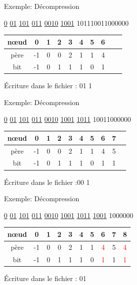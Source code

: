 \documentclass[french]{beamer}
\begin{document}
\begin{frame}{Exemple: Décompression}
\begin{center}
\underline{0} \underline{01} \underline{101} \underline{011} \underline{0010} \underline{1001} 101110011000000
\end{center}

	\begin{center}
	\begin{tabular}{|c|c|c|c|c|c|c|c|c|c|}
	\hline
	nœud & 0 & 1 & 2 & 3 & 4 & 5 & 6 \\
	\hline
	père & -1 & 0 & 0 & 2 & 1 & 1 & 4  \\
	\hline
	bit & -1 & 0 & 1 & 1 & 1 & 0 & 1 \\
	\hline 
	\end{tabular}
	\end{center}
	\begin{center}
	Écriture dans le fichier : 01 1
	\end{center}
\end{frame}

\begin{frame}{Exemple: Décompression}
\begin{center}
\underline{0} \underline{01} \underline{101} \underline{011} \underline{0010} \underline{1001} \underline{1011} 10011000000
\end{center}

	\begin{center}
	\begin{tabular}{|c|c|c|c|c|c|c|c|c|c|}
	\hline
	nœud & 0 & 1 & 2 & 3 & 4 & 5 & 6 & 7 \\
	\hline
	père & -1 & 0 & 0 & 2 & 1 & 1 & 4 & 5  \\
	\hline
	bit & -1 & 0 & 1 & 1 & 1 & 0 & 1 & 1 \\
	\hline 
	\end{tabular}
	\end{center}
	\begin{center}
	Écriture dans le fichier :00  1
	\end{center}
\end{frame}

\begin{frame}{Exemple: Décompression}
\begin{center}
\underline{0} \underline{01} \underline{101} \underline{011} \underline{0010} \underline{1001} \underline{1011} \underline{1001} 1000000
\end{center}

\begin{center}
	\begin{tabular}{|c|c|c|c|c|c|c|c|c|c|}
	\hline
	nœud & 0 & 1 & 2 & 3 & 4 & 5 & 6 & 7 & 8 \\
	\hline
	père & -1 & 0 & 0 & 2 & 1 & 1 & \textcolor{red}{4} & 5 & \textcolor{red}{4} \\
	\hline
	bit & -1 & 0 & 1 & 1 & 1 & 0 & \textcolor{red}{1} & 1 & \textcolor{red}{1} \\
	\hline 
	\end{tabular}
	\end{center}
	\begin{center}
	Écriture dans le fichier : 01
	\end{center}
\end{frame}
\end{document}
